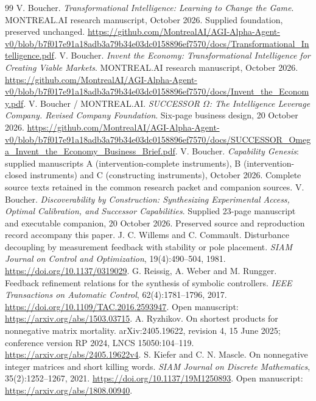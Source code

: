 \documentclass[11pt,letterpaper]{article}
\theoremstyle{definition}\newtheorem{definition}[theorem]{Definition}
\theoremstyle{remark}\newtheorem{remark}[theorem]{Remark}
\begin{document}
\clearpage
\begin{thebibliography}{99}\small
{} V. Boucher. \emph{Transformational Intelligence: Learning to Change the Game}. MONTREAL.AI research manuscript, October 2026. Supplied foundation, preserved unchanged. \url{https://github.com/MontrealAI/AGI-Alpha-Agent-v0/blob/b7f017e91a18adb3a79b34e03dc0158896ef7570/docs/Transformational_Intelligence.pdf}.
 V. Boucher. \emph{Invent the Economy: Transformational Intelligence for Creating Viable Markets}. MONTREAL.AI research manuscript, October 2026. \url{https://github.com/MontrealAI/AGI-Alpha-Agent-v0/blob/b7f017e91a18adb3a79b34e03dc0158896ef7570/docs/Invent_the_Economy.pdf}.
 V. Boucher / MONTREAL.AI. \emph{SUCCESSOR $\Omega$: The Intelligence Leverage Company. Revised Company Foundation}. Six-page business design, 20 October 2026. \url{https://github.com/MontrealAI/AGI-Alpha-Agent-v0/blob/b7f017e91a18adb3a79b34e03dc0158896ef7570/docs/SUCCESSOR_Omega_Invent_the_Economy_Business_Brief.pdf}.
 V. Boucher. \emph{Capability Genesis}: supplied manuscripts A (intervention-complete instruments), B (intervention-closed instruments) and C (constructing instruments), October 2026. Complete source texts retained in the common research packet and companion sources.
 V. Boucher. \emph{Discoverability by Construction: Synthesizing Experimental Access, Optimal Calibration, and Successor Capabilities}. Supplied 23-page manuscript and executable companion, 20 October 2026. Preserved source and reproduction record accompany this paper.
 J. C. Willems and C. Commault. Disturbance decoupling by measurement feedback with stability or pole placement. \emph{SIAM Journal on Control and Optimization}, 19(4):490--504, 1981. \url{https://doi.org/10.1137/0319029}.
 G. Reissig, A. Weber and M. Rungger. Feedback refinement relations for the synthesis of symbolic controllers. \emph{IEEE Transactions on Automatic Control}, 62(4):1781--1796, 2017. \url{https://doi.org/10.1109/TAC.2016.2593947}. Open manuscript: \url{https://arxiv.org/abs/1503.03715}.
 A. Ryzhikov. On shortest products for nonnegative matrix mortality. arXiv:2405.19622, revision 4, 15 June 2025; conference version RP 2024, LNCS 15050:104--119. \url{https://arxiv.org/abs/2405.19622v4}.
 S. Kiefer and C. N. Mascle. On nonnegative integer matrices and short killing words. \emph{SIAM Journal on Discrete Mathematics}, 35(2):1252--1267, 2021. \url{https://doi.org/10.1137/19M1250893}. Open manuscript: \url{https://arxiv.org/abs/1808.00940}.

\end{thebibliography}
\end{document}
